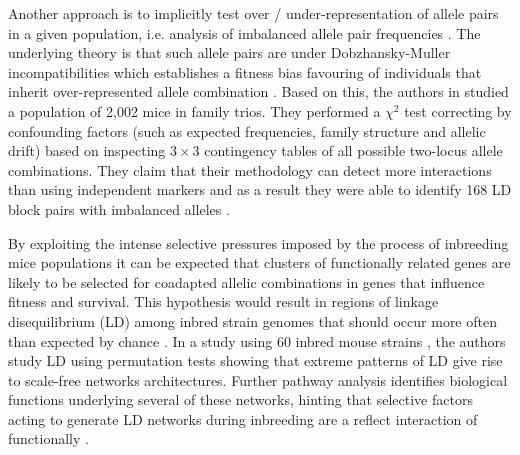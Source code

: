 Another approach is to implicitly test over / under-representation of allele pairs in a given population, i.e. analysis of imbalanced allele pair frequencies \cite{ackermann2012systematic}.
The underlying theory is that such allele pairs are under Dobzhansky-Muller incompatibilities which establishes a fitness bias favouring of individuals that inherit over-represented allele combination \cite{ackermann2012systematic}.
Based on this, the authors in \cite{ackermann2012systematic} studied a population of 2,002 mice in family trios.
They performed a $\chi^2$ test correcting by confounding factors (such as expected frequencies, family structure and allelic drift) based on inspecting $3 \times 3$ contingency tables of all possible two-locus allele combinations.
They claim that their methodology can detect more interactions than using independent markers and as a result they were able to identify 168 LD block pairs with imbalanced alleles \cite{ackermann2012systematic}.

By exploiting the  intense selective pressures imposed by the process of inbreeding mice populations it can be expected that clusters of functionally related genes are likely to be selected for coadapted allelic combinations in genes that influence fitness and survival.
This hypothesis would result in regions of linkage disequilibrium (LD) among inbred strain genomes that should occur more often than expected by chance \cite{petkov2005evidence}.
In a study using 60 inbred mouse strains \cite{petkov2005evidence}, the authors study LD using permutation tests showing that extreme patterns of LD give rise to scale-free networks architectures.
Further pathway analysis identifies biological functions underlying several of these networks, hinting that selective factors acting to generate LD networks during inbreeding are a reflect  interaction of functionally \cite{petkov2005evidence}.



